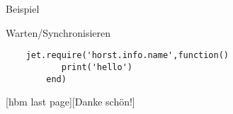 \documentclass[xelatex,hyperref={pdfpagelabels=false}]{beamer}
\begin{document}
\begin{frame}[fragile]{Beispiel}
  \begin{block}{Warten/Synchronisieren}
  \begin{lstlisting}
    jet.require('horst.info.name',function()
           print('hello')
        end)
  \end{lstlisting}
\end{block}
\end{frame}



[hbm last page][Danke schön!]
\begin{frame}
  \titlepage
\end{frame}
\end{document}
